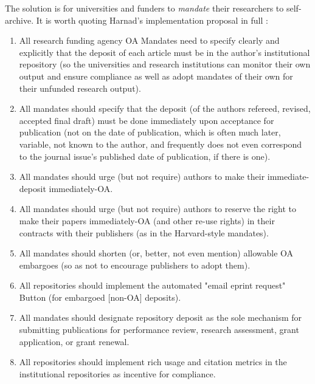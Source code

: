 \documentclass[11pt, openany, oneside, article, a4paper, twocolumn]{memoir}
\begin{document}
The solution is for universities and funders to \emph{mandate} their
researchers to self-archive. It is worth quoting Harnad's implementation proposal in full \cite{harnad2015openwhat}:
\begin{small}
\begin{enumerate}[(1)]
\item All research funding agency OA Mandates need to specify clearly and explicitly that the deposit of each
article must be in the author’s institutional repository (so the universities
and research institutions can monitor their own output and ensure compliance as
well as adopt mandates of their own for their unfunded research output).
\item All mandates should specify that the deposit (of the authors refereed, revised,
accepted final draft) must be done immediately upon acceptance for publication
(not on the date of publication, which is often much later, variable, not known
to the author, and frequently does not even correspond to the journal issue’s
published date of publication, if there is one).
\item All mandates should urge
(but not require) authors to make their immediate-deposit immediately-OA.
\item All mandates should urge (but not require) authors to reserve the right to make
their papers immediately-OA (and other re-use rights) in their contracts with
their publishers (as in the Harvard-style mandates).
\item All mandates should
shorten (or, better, not even mention) allowable OA embargoes (so as not to
encourage publishers to adopt them).
\item All repositories should implement the
automated "email eprint request" Button (for embargoed [non-OA] deposits).
\item All mandates should designate repository deposit as the sole mechanism for
submitting publications for performance review, research assessment, grant
application, or grant renewal.
\item All repositories should implement rich usage
and citation metrics in the institutional repositories as incentive for
compliance.
\end{enumerate}
\end{small}
\end{document}

